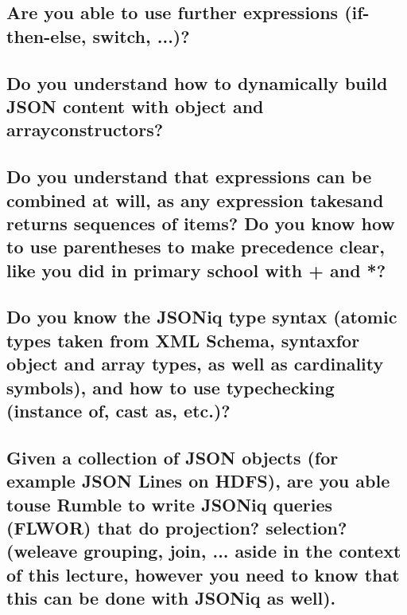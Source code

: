 \documentclass{article}
\begin{document}
\subsection{Are you able to use further expressions (if-then-else, switch, ...)?}
\subsection{Do you understand how to dynamically build JSON content with object and arrayconstructors?}
\subsection{Do you understand that expressions can be combined at will, as any expression takesand returns sequences of items? Do you know how to use parentheses to make precedence clear, like you did in primary school with + and *?}
\subsection{Do you know the JSONiq type syntax (atomic types taken from XML Schema, syntaxfor object and array types, as well as cardinality symbols), and how to use typechecking (instance of, cast as, etc.)?}
\subsection{Given a collection of JSON objects (for example JSON Lines on HDFS), are you able touse Rumble to write JSONiq queries (FLWOR) that do projection? selection? (weleave grouping, join, ... aside in the context of this lecture, however you need to know that this can be done with JSONiq as well).}

\end{document}

